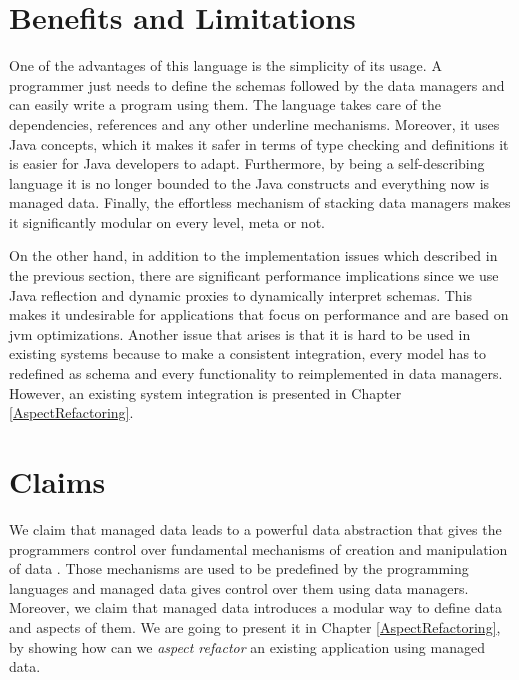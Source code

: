 \section{Benefits and Limitations}\label{Benefits and Limitations}
One of the advantages of this language is the simplicity of its usage. 
A programmer just needs to define the schemas followed by the data managers and can easily write a program using them.
The language takes care of the dependencies, references and any other underline mechanisms.
Moreover, it uses Java concepts, which it makes it safer in terms of type checking and definitions it is easier for Java developers to adapt.
Furthermore, by being a self-describing language it is no longer bounded to the Java constructs and everything now is managed data.
Finally, the effortless mechanism of stacking data managers makes it significantly modular on every level, meta or not.

On the other hand, in addition to the implementation issues which described in the previous section, there are significant performance implications since we use Java reflection and dynamic proxies to dynamically interpret schemas. 
This makes it undesirable for applications that focus on performance and are based on \ac{jvm} optimizations.
Another issue that arises is that it is hard to be used in existing systems because to make a consistent integration, every model has to redefined as schema and every functionality to reimplemented in data managers.
However, an existing system integration is presented in Chapter \ref{AspectRefactoring}.

\section{Claims}\label{Implementation Claims}
We claim that managed data leads to a powerful data abstraction that gives the programmers control over fundamental mechanisms of creation and manipulation of data \cite{loh2012managed}.
Those mechanisms are used to be predefined by the programming languages and managed data gives control over them using data managers.
Moreover, we claim that managed data introduces a modular way to define data and aspects of them. 
We are going to present it in Chapter \ref{AspectRefactoring}, by showing how can we \textit{aspect refactor} an existing application using managed data.
